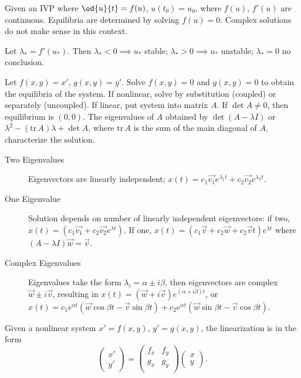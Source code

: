   \item[Stability of Equilibria] Given an IVP where $\od{u}{t}=f(u)$,
    $u(t_0)=u_0$, where $f(u)$, $f'(u)$ are continuous. Equilibria are
    determined by solving $f(u)=0$. Complex solutions do not make sense in this
    context.
  \item[Derivative Method for Stability] Let $\lambda_*=f'(u_*)$. Then
    $\lambda_*<0\implies u_*$ stable; $\lambda_*>0\implies u_*$ unstable;
    $\lambda_*=0$ no conclusion.
  \item[2D Dynamical Systems] Let $f(x,y) = x'$, $g(x,y) = y'$. Solve $f(x,y)=0$
    and $g(x,y)=0$ to obtain the equilibria of the system. If nonlinear, solve
    by substitution (coupled) or separately (uncoupled). If linear, put system
    into matrix $A$. If $\det A \ne 0$, then equilibrium is $(0,0)$. The
    eigenvalues of $A$ obtained by $\det(A-\lambda I)$ or
    $\lambda^2-(\text{tr}\,A)\lambda+\det A$, where $\text{tr}\,A$ is the sum of
    the main diagonal of $A$, characterize the solution.
    \begin{description}
    \item[Two Eigenvalues] Eigenvectors are linearly independent;
      $x(t)=c_1\vec{v_1}e^{\lambda_1 t}+c_2\vec{v_2}e^{\lambda_2 t}$.
    \item[One Eigenvalue] Solution depends on number of linearly independent
      eigenvectors: if two, $x(t)=(c_1\vec{v_1}+c_2\vec{v_2}e^{\lambda t})$. If
      one, $x(t)=(c_1\vec{v}+c_2\vec{w}+c_2\vec{v}t)e^{\lambda t}$ where
      $(A-\lambda I)\vec{w}=\vec{v}$.
    \item[Complex Eigenvalues] Eigenvalues take the form $\lambda_i = \alpha \pm
      i\beta$, then eigenvectors are complex $\vec{w}\pm i\vec{v}$, resulting in
      $x(t)=(\vec{w}+i\vec{v})e^{(\alpha+i\beta)t}$, or $x(t)=c_1e^{\alpha
        t}(\vec{w}\cos\beta t-\vec{v}\sin\beta t) + c_2e^{\alpha
        t}(\vec{w}\sin\beta t-\vec{v}\cos\beta t)$.
    \end{description}
  \item[Linearization] Given a nonlinear system $x'=f(x,y)$, $y'=g(x,y)$, the
    linearization is in the form
    \begin{equation*}
      \begin{pmatrix} x' \\ y' \end{pmatrix} =
      \begin{pmatrix} f_x & f_y \\ g_x & g_y \\ \end{pmatrix}
      \begin{pmatrix} x \\ y \end{pmatrix}.
    \end{equation*}
